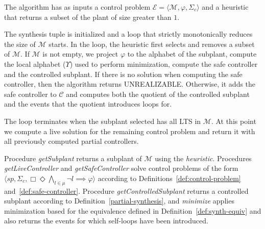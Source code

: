 The algorithm has as inputs a control problem $\mathcal{E} = \langle \mathcal{M}, \varphi, \Sigma_c \rangle$ and a heuristic that returns a subset of the plant of size greater than $1$.



\vspace{0.2cm}
The synthesis tuple is initialized and a loop that strictly monotonically reduces the size of $\mathcal{M}$ starts. 
In the loop, the heuristic first selects and removes a subset of $\mathcal{M}$. If $\mathcal{M}$ is not empty, we project $\varphi$ to the alphabet of the subplant, compute the local alphabet ($\Upsilon$)  used to perform minimization, compute the safe controller and the controlled subplant. 
 If there is no solution when computing the safe controller, then the algorithm returns UNREALIZABLE. Otherwise, it adds the safe controller to $\mathcal{C}$ and computes both the quotient of the controlled subplant and the events that the quotient introduces loops for.  


  
The loop terminates when the subplant selected has all LTS in $\mathcal{M}$. At this point we compute a live solution for the remaining control problem and return it with  all previously computed partial controllers.







Procedure \textit{getSubplant} returns a subplant of $\mathcal{M}$ using the \textit{heuristic}. Procedures \textit{getLiveController}
and \textit{getSafeController} solve control problems of the form $\langle sp, \Sigma_c,  \Box\Diamond\bigwedge_{l\in \mu}\neg l \implies \varphi \rangle$ according to Definitions~\ref{def:control-problem} and~\ref{def:safe-controller}. Procedure \textit{getControlledSubplant} returns a controlled subplant according to Definition~\ref{partial-synthesis}, and \textit{minimize} applies minimization based for the equivalence defined in Definition~\ref{def:synth-equiv} and also returns the events for which self-loops have been introduced. 


